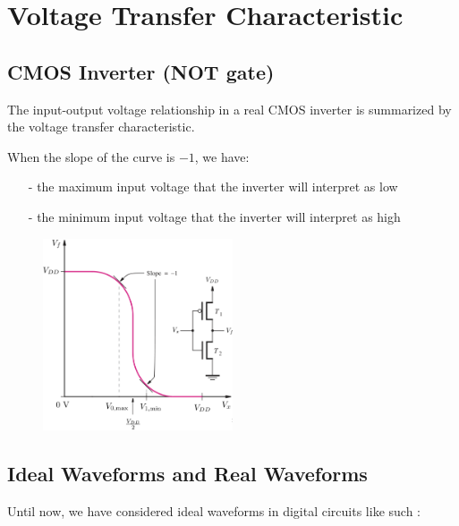 \documentclass[12pt,openany, tikz,border=10pt]{book}
\begin{document}
    \newpage
\section{Voltage Transfer Characteristic}
\subsection{CMOS Inverter (NOT gate)}

The input-output voltage relationship in a real CMOS inverter is summarized by the voltage transfer characteristic.

When the slope of the curve is \(-1\), we have:
\begin{itemize}
    \item[-] the maximum input voltage that the inverter will interpret as low
    \item[-] the minimum input voltage that the inverter will interpret as high
\end{itemize}

\begin{figure}[h]
\centering
\includegraphics[width=0.5\textwidth]{circuits/9.3.1.png} 
\label{fig:voltage_transfer}
\end{figure}

\subsection{Ideal Waveforms and Real Waveforms}
Until now, we have considered ideal waveforms in digital circuits like such :

\begin{center}
    

\end{center}
\end{document}
